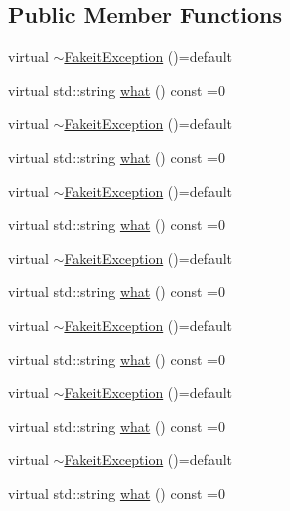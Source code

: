 \subsection*{Public Member Functions}
\begin{DoxyCompactItemize}
\item 
virtual \mbox{\hyperlink{structfakeit_1_1FakeitException_a80baf49dc322fe156c4291ec40809d9c}{$\sim$\+Fakeit\+Exception}} ()=default
\item 
virtual std\+::string \mbox{\hyperlink{structfakeit_1_1FakeitException_a02ef6315b98e4382157c2106a62f7718}{what}} () const =0
\item 
virtual \mbox{\hyperlink{structfakeit_1_1FakeitException_a80baf49dc322fe156c4291ec40809d9c}{$\sim$\+Fakeit\+Exception}} ()=default
\item 
virtual std\+::string \mbox{\hyperlink{structfakeit_1_1FakeitException_a02ef6315b98e4382157c2106a62f7718}{what}} () const =0
\item 
virtual \mbox{\hyperlink{structfakeit_1_1FakeitException_a80baf49dc322fe156c4291ec40809d9c}{$\sim$\+Fakeit\+Exception}} ()=default
\item 
virtual std\+::string \mbox{\hyperlink{structfakeit_1_1FakeitException_a02ef6315b98e4382157c2106a62f7718}{what}} () const =0
\item 
virtual \mbox{\hyperlink{structfakeit_1_1FakeitException_a80baf49dc322fe156c4291ec40809d9c}{$\sim$\+Fakeit\+Exception}} ()=default
\item 
virtual std\+::string \mbox{\hyperlink{structfakeit_1_1FakeitException_a02ef6315b98e4382157c2106a62f7718}{what}} () const =0
\item 
virtual \mbox{\hyperlink{structfakeit_1_1FakeitException_a80baf49dc322fe156c4291ec40809d9c}{$\sim$\+Fakeit\+Exception}} ()=default
\item 
virtual std\+::string \mbox{\hyperlink{structfakeit_1_1FakeitException_a02ef6315b98e4382157c2106a62f7718}{what}} () const =0
\item 
virtual \mbox{\hyperlink{structfakeit_1_1FakeitException_a80baf49dc322fe156c4291ec40809d9c}{$\sim$\+Fakeit\+Exception}} ()=default
\item 
virtual std\+::string \mbox{\hyperlink{structfakeit_1_1FakeitException_a02ef6315b98e4382157c2106a62f7718}{what}} () const =0
\item 
virtual \mbox{\hyperlink{structfakeit_1_1FakeitException_a80baf49dc322fe156c4291ec40809d9c}{$\sim$\+Fakeit\+Exception}} ()=default
\item 
virtual std\+::string \mbox{\hyperlink{structfakeit_1_1FakeitException_a02ef6315b98e4382157c2106a62f7718}{what}} () const =0

\end{DoxyCompactItemize}
